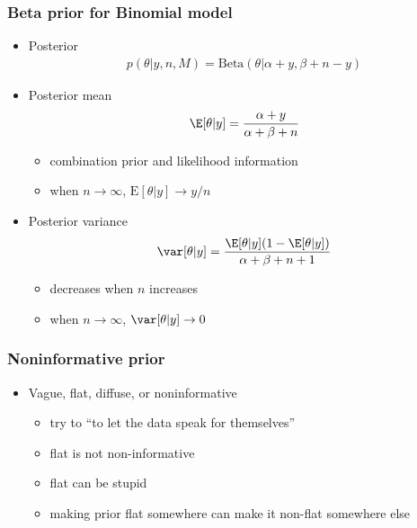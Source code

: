 \documentclass[10pt]{beamer}
\begin{document}
\begin{frame}
  \frametitle{Beta prior for Binomial model}

  \begin{itemize}
  \item Posterior
    \baselineskip
    \begin{align*}
      p(\theta|y,n,M) = \text{Beta}(\theta|\alpha+y,\beta+n-y)
    \end{align*}
    \item Posterior mean
    \baselineskip
    \begin{align*}
      \E[\theta|y] = \frac{\alpha+y}{\alpha+\beta+n}
    \end{align*}
    \begin{itemize}
    \item combination prior and likelihood information
    \item when $n\rightarrow\infty$, $\text{E}[\theta|y]\rightarrow y/n$
    \end{itemize}
    \pause
  \item  Posterior variance
    \baselineskip
    \begin{align*}
      \var[\theta|y]=\frac{\E[\theta|y](1-\E[\theta|y])}{\alpha+\beta+n+1}
    \end{align*}
    \begin{itemize}
    \item decreases when $n$ increases
    \item when $n\rightarrow\infty$, $\var[\theta|y]\rightarrow 0$
    \end{itemize}
  \end{itemize}

\end{frame}

\begin{frame}
\frametitle{Noninformative prior}

\begin{itemize}
  \item Vague, flat, diffuse, or noninformative
  \begin{itemize}
    \item try to ``to let the data speak for themselves''
    \item flat is not non-informative
    \item flat can be stupid
    \item making prior flat somewhere can make it non-flat somewhere
      else
  \end{itemize}
\end{itemize}

\end{frame}
\end{document}
